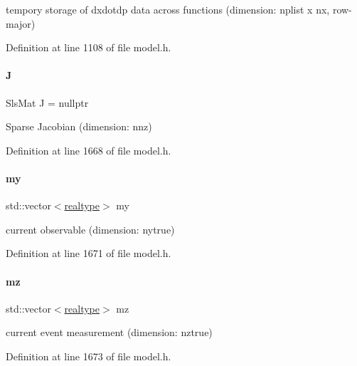 tempory storage of dxdotdp data across functions (dimension\+: nplist x nx, row-\/major) 

Definition at line 1108 of file model.\+h.

\mbox{\label{classamici_1_1_model_a71cc1d93543998249a172328e1a4dbcd}} 
\paragraph{\texorpdfstring{J}{J}}
{\footnotesize\ttfamily Sls\+Mat J = nullptr\hspace{0.3cm}{\ttfamily [protected]}}

Sparse Jacobian (dimension\+: nnz) 

Definition at line 1668 of file model.\+h.

\mbox{\label{classamici_1_1_model_ab9db87a0acf848c904c792edab3b5828}} 
\paragraph{\texorpdfstring{my}{my}}
{\footnotesize\ttfamily std\+::vector$<$\mbox{\hyperlink{namespaceamici_a1bdce28051d6a53868f7ccbf5f2c14a3}{realtype}}$>$ my\hspace{0.3cm}{\ttfamily [protected]}}

current observable (dimension\+: nytrue) 

Definition at line 1671 of file model.\+h.

\mbox{\label{classamici_1_1_model_afff14791b6839ad61750cc360e44e890}} 
\paragraph{\texorpdfstring{mz}{mz}}
{\footnotesize\ttfamily std\+::vector$<$\mbox{\hyperlink{namespaceamici_a1bdce28051d6a53868f7ccbf5f2c14a3}{realtype}}$>$ mz\hspace{0.3cm}{\ttfamily [protected]}}

current event measurement (dimension\+: nztrue) 

Definition at line 1673 of file model.\+h.

